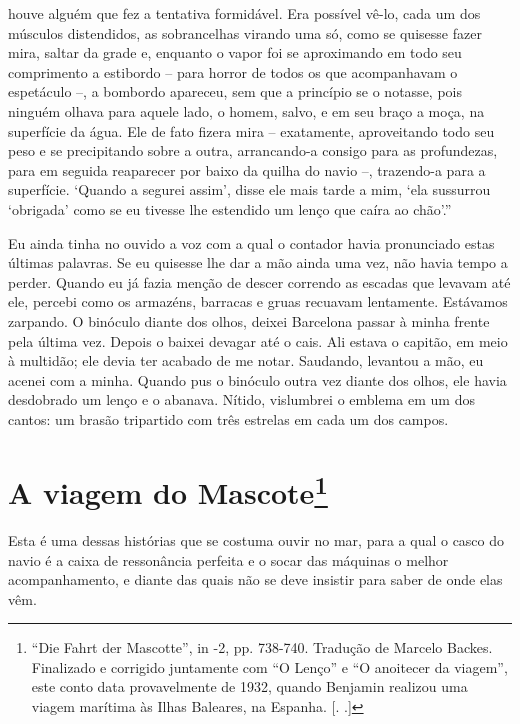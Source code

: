 houve alguém que fez a tentativa formidável. Era possível vê-lo, cada um
dos músculos distendidos, as sobrancelhas virando uma só, como se
quisesse fazer mira, saltar da grade e, enquanto o vapor foi se
aproximando em todo seu comprimento a estibordo -- para horror de todos
os que acompanhavam o espetáculo --, a bombordo apareceu, sem que a
princípio se o notasse, pois ninguém olhava para aquele lado, o homem,
salvo, e em seu braço a moça, na superfície da água. Ele de fato fizera
mira -- exatamente, aproveitando todo seu peso e se precipitando sobre a
outra, arrancando-a consigo para as profundezas, para em seguida
reaparecer por baixo da quilha do navio --, trazendo-a para a
superfície. `Quando a segurei assim', disse ele mais tarde a mim, `ela
sussurrou `obrigada' como se eu tivesse lhe estendido um lenço que caíra
ao chão'.''\label{supra9}

Eu ainda tinha no ouvido a voz com a qual o contador havia pronunciado
estas últimas palavras. Se eu quisesse lhe dar a mão ainda uma vez, não
havia tempo a perder. Quando eu já fazia menção de descer correndo as
escadas que levavam até ele, percebi como os armazéns, barracas e gruas
recuavam lentamente. Estávamos zarpando. O binóculo diante dos olhos,
deixei Barcelona passar à minha frente pela última vez. Depois o baixei
devagar até o cais. Ali estava o capitão, em meio à multidão; ele devia
ter acabado de me notar. Saudando, levantou a mão, eu acenei com a
minha. Quando pus o binóculo outra vez diante dos olhos, ele havia
desdobrado um lenço e o abanava. Nítido, vislumbrei o emblema em um dos
cantos: um brasão tripartido com três estrelas em cada um dos campos.

\chapter{A viagem do Mascote\footnote[*]{``Die Fahrt der Mascotte'', in  -2, pp.
  738-740. Tradução de Marcelo Backes. Finalizado e corrigido juntamente
  com ``O Lenço'' e ``O anoitecer da viagem'', este conto data
  provavelmente de 1932, quando Benjamin realizou uma viagem marítima às
  Ilhas Baleares, na Espanha. [. .]} }

Esta é uma dessas histórias que se costuma ouvir no mar, para a qual o
casco do navio é a caixa de ressonância perfeita e o socar das máquinas
o melhor acompanhamento, e diante das quais não se deve insistir para
saber de onde elas vêm.

